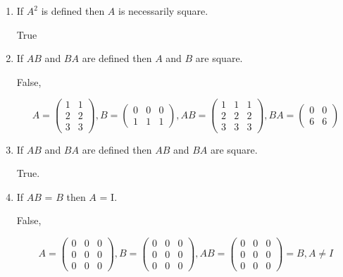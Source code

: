 \documentclass[12pt,letterpaper]{article}
\begin{document}
      \begin{enumerate}
        \item
          If $A^2$ is defined then $A$ is necessarily square.

          True
        \item
          If $AB$ and $BA$ are deﬁned then $A$ and $B$ are square.

          False,

          \[
            A = \left(
            \begin{array}{cc}
            1 & 1 \\
            2 & 2 \\
            3 & 3
            \end{array}
            \right)
            ,
            B = \left(
            \begin{array}{ccc}
              0 & 0 & 0 \\
              1 & 1 & 1
            \end{array}
            \right)
            ,
            AB = \left(
            \begin{array}{ccc}
              1 & 1 & 1 \\
              2 & 2 & 2 \\
              3 & 3 & 3
            \end{array}
            \right)
            ,
            BA = \left(
            \begin{array}{cc}
              0 & 0 \\
              6 & 6
            \end{array}
            \right)
          \]
        \item
          If $AB$ and $BA$ are deﬁned then $AB$ and $BA$ are square.

          True.
        \item
          If $AB$ = $B$ then $A$ = I.

          False,

          \[
            A = \left(
            \begin{array}{ccc}
              0 & 0 & 0 \\
              0 & 0 & 0 \\
              0 & 0 & 0
            \end{array}
            \right)
            ,
            B = \left(
            \begin{array}{ccc}
              0 & 0 & 0 \\
              0 & 0 & 0 \\
              0 & 0 & 0
            \end{array}
            \right)
            ,
            AB = \left(
            \begin{array}{ccc}
              0 & 0 & 0 \\
              0 & 0 & 0 \\
              0 & 0 & 0
            \end{array}
            \right) = B
            , A \ne I
          \]

      \end{enumerate}
\end{document}
